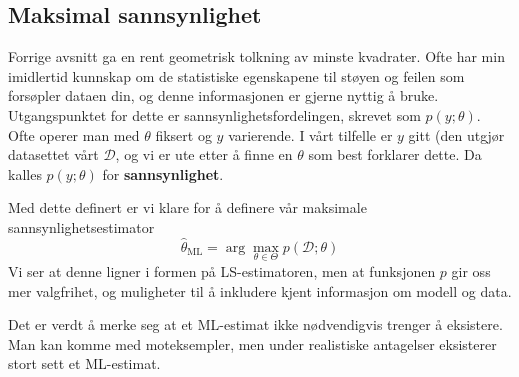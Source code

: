 \subsection{Maksimal sannsynlighet}
Forrige avsnitt ga en rent geometrisk tolkning av minste kvadrater. Ofte har min imidlertid kunnskap om de statistiske egenskapene til støyen og feilen som forsøpler dataen din, og denne informasjonen er gjerne nyttig å bruke. Utgangspunktet for dette er sannsynlighetsfordelingen, skrevet som $p(y ; \theta)$. Ofte operer man med $\theta$ fiksert og $y$ varierende. I vårt tilfelle er $y$ gitt (den utgjør datasettet vårt $\mathcal{D}$, og vi er ute etter å finne en $\theta$ som best forklarer dette. Da kalles $p(y ; \theta)$ for \textbf{sannsynlighet}.

Med dette definert er vi klare for å definere vår maksimale sannsynlighetsestimator
\begin{equation}
\widehat{\theta}_{\mathrm{ML}}=\arg \max _{\theta \in \Theta} p(\mathcal{D} ; \theta)
\end{equation}
Vi ser at denne ligner i formen på LS-estimatoren, men at funksjonen $p$ gir oss mer valgfrihet, og muligheter til å inkludere kjent informasjon om modell og data.

Det er verdt å merke seg at et ML-estimat ikke nødvendigvis trenger å eksistere. Man kan komme med moteksempler, men under realistiske antagelser eksisterer stort sett et ML-estimat. 

